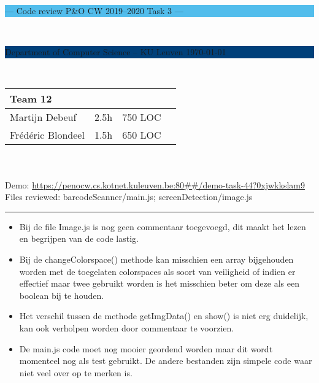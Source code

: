 \documentclass[a4paper,11pt]{article}
\begin{document}
\noindent
\colorbox[HTML]{52BDEC}{\bfseries\parbox{\textwidth}{\centering\large
  --- Code review P\&O CW 2019--2020 Task 3 ---
}}
\\[-1mm]
\colorbox[HTML]{00407A}{\bfseries\color{white}\parbox{\textwidth}{
  Department of Computer Science -- KU Leuven
  \hfill
  \today
}}
\\

\smallskip

\noindent
\begin{tabular}{*4l}
\toprule
\multicolumn{3}{l}{\large\textbf{Team 12}} \\
\midrule
Martijn Debeuf & 2.5h & 750 LOC \\ %
Frédéric Blondeel & 1.5h & 650 LOC \\
\bottomrule
\hline
\end{tabular}\\
\\
Demo: \url{https://penocw.cs.kotnet.kuleuven.be:80##/demo-task-44?0xjwkkslam9} \\
Files reviewed: barcodeScanner/main.js; screenDetection/image.js

\noindent
{\color[HTML]{52BDEC} \rule{\linewidth}{1mm} }

\smallskip

\begin{itemize}

\item Bij de file Image.js is nog geen commentaar toegevoegd, dit maakt het lezen en begrijpen van de code lastig. 
\item Bij de changeColorspace() methode kan misschien een array bijgehouden worden met de toegelaten colorspaces als soort van veiligheid of indien er effectief maar twee gebruikt worden is het misschien beter om deze als een boolean bij te houden. 
\item Het verschil tussen de methode getImgData() en show() is niet erg duidelijk, kan ook verholpen worden door commentaar te voorzien.
\item De main.js code moet nog mooier geordend worden maar dit wordt momenteel nog als test gebruikt. De andere bestanden zijn simpele code waar niet veel over op te merken is.


\end{itemize}
\end{document}
